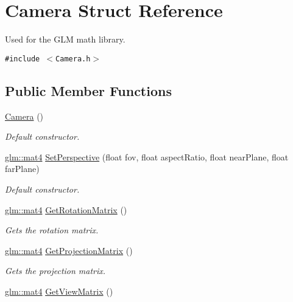 \hypertarget{class_camera}{
\section{Camera Struct Reference}
\label{class_camera}
}
Used for the GLM math library.  


{\tt \#include $<$Camera.h$>$}

\subsection*{Public Member Functions}
\begin{CompactItemize}
\item 
\hyperlink{class_camera_01f94c3543f56ede7af49dc778f19331}{Camera} ()
\begin{CompactList}\small\item\em Default constructor. \item\end{CompactList}\item 
\hyperlink{group__core__types_g7dcd2365c2e368e6af5b7adeb6a9c8df}{glm::mat4} \hyperlink{class_camera_621b0ca0ddcab43fb95ee754c443dfa4}{SetPerspective} (float fov, float aspectRatio, float nearPlane, float farPlane)
\begin{CompactList}\small\item\em Default constructor. \item\end{CompactList}\item 
\hyperlink{group__core__types_g7dcd2365c2e368e6af5b7adeb6a9c8df}{glm::mat4} \hyperlink{class_camera_3518233b244af839db6eefe59e7002de}{GetRotationMatrix} ()
\begin{CompactList}\small\item\em Gets the rotation matrix. \item\end{CompactList}\item 
\hyperlink{group__core__types_g7dcd2365c2e368e6af5b7adeb6a9c8df}{glm::mat4} \hyperlink{class_camera_b0a4bf5a65d45f25529e3cffda1c361b}{GetProjectionMatrix} ()
\begin{CompactList}\small\item\em Gets the projection matrix. \item\end{CompactList}\item 
\hyperlink{group__core__types_g7dcd2365c2e368e6af5b7adeb6a9c8df}{glm::mat4} \hyperlink{class_camera_ffa333055635aed96518c4c66be9a70c}{GetViewMatrix} ()

\end{CompactItemize}
